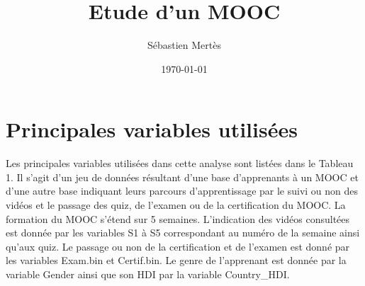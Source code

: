 \documentclass[12pt, a4paper, titlepage, table]{article}
\begin{document}
	\label{document}
	\title{Etude d'un MOOC}
	\author{Sébastien Mertès}
	\date{\today}
	\maketitle
	\renewcommand{\thesection}{\arabic{section}.}
	\renewcommand{\thesubsection}{\thesection\arabic{subsection}}
	\renewcommand{\tablename}{Tableau}
	\renewcommand{\abstractname}{Résumé}
	\setlength{\parindent}{0pt}
	\captionsetup{labelfont=bf}
	\tableofcontents

\newpage	
\section{Principales variables utilisées}
Les principales variables utilisées dans cette analyse sont listées dans le Tableau 1. Il s'agit d'un jeu de données résultant d'une base d'apprenants à un MOOC et d'une autre base indiquant leurs parcours d'apprentissage par le suivi ou non des vidéos et le passage des quiz, de l'examen ou de la certification du MOOC. La formation du MOOC s'étend sur 5 semaines. L'indication des vidéos consultées est donnée par les variables S1 à S5 correspondant au numéro de la semaine  ainsi qu'aux quiz.
Le passage ou non de la certification et de l'examen est donné par les variables Exam.bin et Certif.bin. Le genre de l'apprenant est donnée par la variable Gender ainsi que son HDI par la variable Country\_HDI.
\end{document}
